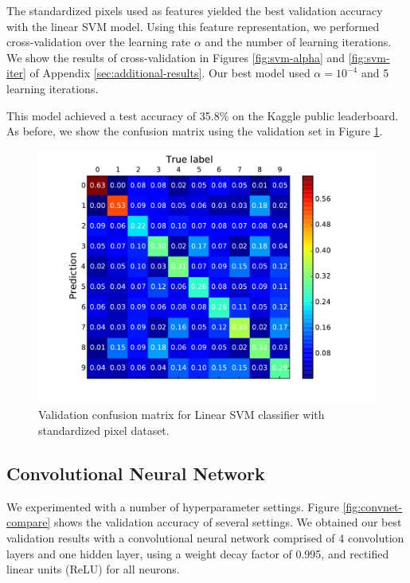 \documentclass{acm_proc_article-sp}
\begin{document}
The standardized pixels used as features yielded the best validation accuracy with the linear SVM model. Using this feature representation, we performed cross-validation over the learning rate $\alpha$ and the number of learning iterations. We show the results of cross-validation in Figures \ref{fig:svm-alpha} and \ref{fig:svm-iter} of Appendix \ref{sec:additional-results}. Our best model used $\alpha =10^{-4} $ and 5 learning iterations.

This model achieved a test accuracy of 35.8\% on the Kaggle public leaderboard. As before, we show the confusion matrix using the validation set in Figure \ref{fig:svm-conf}. 

\begin{figure}[h!]
	\centering
	\includegraphics[width=\linewidth]{SVM_standard_confusion}
  	\caption{Validation confusion matrix for Linear SVM classifier with standardized pixel dataset. }
  	\label{fig:svm-conf}
\end{figure}


\subsection{Convolutional Neural Network}
We experimented with a number of hyperparameter settings. Figure \ref{fig:convnet-compare} shows the validation accuracy of several settings. We obtained our best validation results with a convolutional neural network comprised of 4 convolution layers and one hidden layer, using a weight decay factor of 0.995, and rectified linear units (ReLU)  for all neurons.
\end{document}
